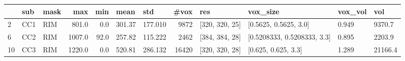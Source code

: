 \begin{tabular}{lllrrllrllll}
\toprule
{} &  sub & mask &     max &   min &    mean &      std &   \#vox &             res &                     vox\_size & vox\_vol &      vol \\
\midrule
2  &  CC1 &  RIM &   801.0 &   0.0 &  301.37 &  177.010 &   9872 &  [320, 320, 25] &        [0.5625, 0.5625, 3.0] &   0.949 &   9370.7 \\
6  &  CC2 &  RIM &  1007.0 &  92.0 &  257.82 &  115.222 &   2462 &  [384, 384, 28] &  [0.5208333, 0.5208333, 3.3] &   0.895 &   2203.9 \\
10 &  CC3 &  RIM &  1220.0 &   0.0 &  520.81 &  286.132 &  16420 &  [320, 320, 28] &          [0.625, 0.625, 3.3] &   1.289 &  21166.4 \\
\bottomrule
\end{tabular}
